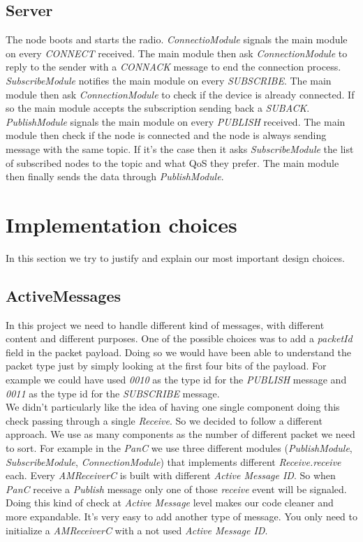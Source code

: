 \documentclass[10pt]{article}
\begin{document}
\subsection{Server}
The node boots and starts the radio. \emph{ConnectioModule} signals the main module on every \emph{CONNECT} received. The main module then ask \emph{ConnectionModule} to reply to the sender with a \emph{CONNACK} message to end the connection process. \emph{SubscribeModule} notifies the main module on every \emph{SUBSCRIBE}. The main module then ask \emph{ConnectionModule} to check if the device is already connected. If so the main module accepts the subscription sending back a \emph{SUBACK}. \emph{PublishModule} signals the main module on every \emph{PUBLISH} received. The main module then check if the node is connected and the node is always sending message with the same topic. If it's the case then it asks \emph{SubscribeModule} the list of subscribed nodes to the topic and what QoS they prefer. The main module then finally sends the data through \emph{PublishModule}.

\section{Implementation choices}
In this section we try to justify and explain our most important design choices.
\subsection{ActiveMessages}
In this project we need to handle different kind of messages, with different content and different purposes. One of the possible choices was to add a \emph{packetId} field in the packet payload. Doing so we would have been able to understand the packet type just by simply looking at the first four bits of the payload. For example we could have used \emph{0010} as the type id for the \emph{PUBLISH} message and \emph{0011} as the type id for the \emph{SUBSCRIBE} message.\\We didn't particularly like the idea of having one single component doing this check passing through a single \emph{Receive}. So we decided to follow a different approach. We use as many components as the number of different packet we need to sort. For example in the \emph{PanC} we use three different modules (\emph{PublishModule}, \emph{SubscribeModule}, \emph{ConnectionModule}) that implements different \emph{Receive.receive} each. Every \emph{AMReceiverC} is built with different \emph{Active Message ID}. So when \emph{PanC} receive a \emph{Publish} message only one of those \emph{receive} event will be signaled.\\Doing this kind of check at \emph{Active Message} level makes our code cleaner and more expandable. It's very easy to add another type of message. You only need to initialize a \emph{AMReceiverC} with a not used \emph{Active Message ID}.
\end{document}

